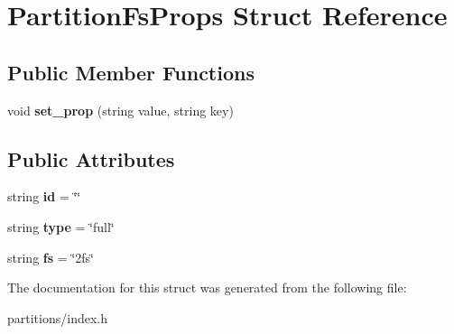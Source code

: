 \hypertarget{structPartitionFsProps}{}\section{Partition\+Fs\+Props Struct Reference}
\label{structPartitionFsProps}
\subsection*{Public Member Functions}
\begin{DoxyCompactItemize}
\item 
\mbox{\label{structPartitionFsProps_a946f80318af5af13502c33217142fa47}} 
void {\bfseries set\+\_\+prop} (string value, string key)
\end{DoxyCompactItemize}
\subsection*{Public Attributes}
\begin{DoxyCompactItemize}
\item 
\mbox{\label{structPartitionFsProps_a8c02dba80a4f9468405a18185e15f587}} 
string {\bfseries id} = \char`\"{}\char`\"{}
\item 
\mbox{\label{structPartitionFsProps_a58fa9d1315b3bd4eb86423449d217be5}} 
string {\bfseries type} = \char`\"{}full\char`\"{}
\item 
\mbox{\label{structPartitionFsProps_a431e2f21dc7c49a7faf62b0077653edc}} 
string {\bfseries fs} = \char`\"{}2fs\char`\"{}
\end{DoxyCompactItemize}


The documentation for this struct was generated from the following file\+:\begin{DoxyCompactItemize}
\item 
partitions/index.\+h\end{DoxyCompactItemize}
